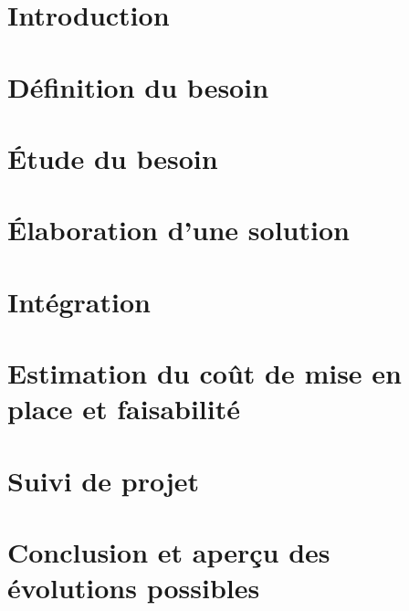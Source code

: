 \documentclass[11pt]{article}
\begin{document}
\newpage

\section{Introduction}

	

\newpage
\section{Définition du besoin}

	
\newpage
\section{Étude du besoin}

	

\newpage
\section{Élaboration d'une solution}

	

\newpage
\section{Intégration}

	

\newpage
\section{Estimation du coût de mise en place et faisabilité}

	

\section{Suivi de projet}

	
\newpage
\section{Conclusion et aperçu des évolutions possibles}
	
	

\setcounter{secnumdepth}{0}
\renewcommand{\thesubsection}{\Alph{subsection}}
\end{document}

